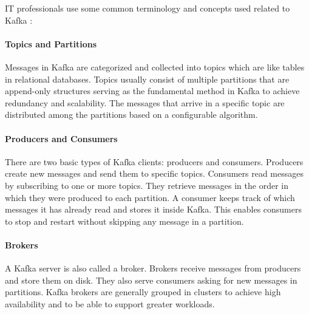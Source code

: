 IT professionals use some common terminology and concepts used related to Kafka \cite{KafkaDefinitive}:

\paragraph{Topics and Partitions} Messages in Kafka are categorized and collected into topics which are like tables in relational databases. Topics usually consist of multiple partitions that are append-only structures serving as the fundamental method in Kafka to achieve redundancy and scalability. The messages that arrive in a specific topic are distributed among the partitions based on a configurable algorithm. 

\paragraph{Producers and Consumers} There are two basic types of Kafka clients: producers and consumers. Producers create new messages and send them to specific topics. Consumers read messages by subscribing to one or more topics. They retrieve messages in the order in which they were produced to each partition. A consumer keeps track of which messages it has already read and stores it inside Kafka. This enables consumers to stop and restart without skipping any message in a partition.

\paragraph{Brokers} A Kafka server is also called a broker. Brokers receive messages from producers and store them on disk. They also serve consumers asking for new messages in partitions. Kafka brokers are generally grouped in clusters to achieve high availability and to be able to support greater workloads.

